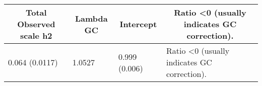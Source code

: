 \begin{center}
\begin{tabular}{llll}
\hline\hline
\multicolumn{1}{c}{Total Observed scale h2}&\multicolumn{1}{c}{Lambda GC}&\multicolumn{1}{c}{Intercept}&\multicolumn{1}{c}{Ratio \textless 0 (usually indicates GC correction).}\tabularnewline
\hline
0.064 (0.0117)&1.0527&0.999 (0.006)&Ratio \textless 0 (usually indicates GC correction).\tabularnewline
\hline
\end{tabular}\end{center}
